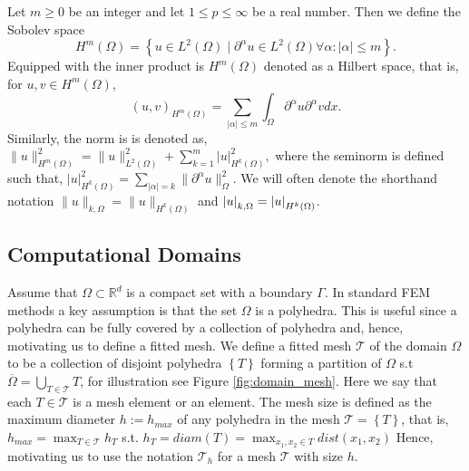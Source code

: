   Let $m\ge 0$ be an integer and let $1 \le  p \le  \infty$ be a real number. Then we define the Sobolev space
\[
H^{m}\left( \Omega  \right) = \left\{ u \in L^{2}\left( \Omega  \right)  \mid  \partial ^{\alpha } u \in L^{2}\left( \Omega  \right)  \forall \alpha : \left\lvert \alpha  \right\rvert  \le m \right\}.
\]
Equipped with the inner product is $H^{m}\left( \Omega  \right) $  denoted as a Hilbert space, that is, for $u,v \in H^{m}\left( \Omega  \right) $, \[
    \left( u,v \right) _{H^{m}\left( \Omega   \right) } = \sum_{\left\lvert \alpha  \right\rvert  \le  m}^{}  \int_{\Omega }^{} \partial ^{\alpha } u \partial ^{\alpha } v dx.
\]
Similarly, the norm is is denoted as,
$
\| u \|_{ H^{m}\left( \Omega  \right)  }^{2  }  =  \| u \|_{ L^{2}\left( \Omega  \right)    }^{2} + \sum_{k = 1}^{m}  \left\lvert u \right\rvert ^{2} _{  H^{k}\left( \Omega  \right) },
$
where the seminorm is defined such that, $ \left\lvert u \right\rvert _{H^{k}( \Omega  ) }^{2} =  \sum_{\left\lvert \alpha  \right\rvert  = k}^{} \| \partial ^{\alpha }u \|_{ \Omega  }^{ 2 }  .
$
We will often denote the shorthand notation $ \| u \|_{ k, \Omega  }^{  } = \| u \|_{ H^{k}( \Omega)  }^{  } $ and $ \left\lvert  u  \right\rvert_{ k, \Omega  }^{  }  = \left\lvert  u  \right\rvert_{ H^{k}( \Omega)  }^{  }$.

\subsection{Computational Domains}%
\label{sub:computational_domain}
Assume that $\Omega \subset \mathbb{R} ^{d} $ is a compact set with a boundary  $\Gamma $. In standard FEM methods a key assumption is that the set $\Omega $ is a polyhedra. This is useful since a polyhedra can be fully covered by a collection of polyhedra and, hence, motivating us to define a fitted mesh.
We define a fitted mesh $\mathcal{T} $ of the domain $\Omega $ to be a collection of disjoint polyhedra $\left\{ T \right\}  $ forming a partition of $\Omega $ s.t $\overline{\Omega } = \bigcup _{T \in \mathcal{T} } T $, for illustration see Figure
\ref{fig:domain_mesh}.
Here we say that each $T \in  \mathcal{T} $ is a mesh element or an element.
The mesh size is defined as the maximum diameter $h := h_{max} $ of any polyhedra in the mesh $\mathcal{T} = \left\{ T \right\}  $, that is, $ h_{max} = \max_{T \in \mathcal{T} }  h_{T}$ s.t.
    $h _{T}  = diam\left( T \right)   = \max_{x_1, x_{2} \in T} dist(x_{1}, x_{2})$
Hence, motivating us to use the notation $\mathcal{T} _{h}$ for a mesh $\mathcal{T} $ with size $h$.

